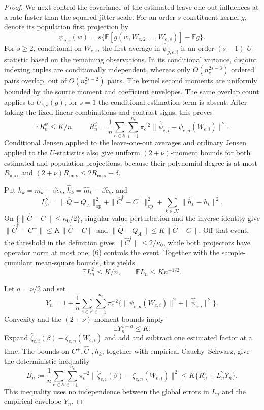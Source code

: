 \documentclass{article}
\begin{document}
\begin{proof}
We next control the covariance of the estimated leave-one-out influences at a rate faster than the squared jitter scale.  For an order-\(s\) constituent kernel \(g\), denote its population first projection by
\[
 \psi_{g,e}(w)=s\{\mathbb E[g(w,W_{e,2},\ldots,W_{e,s})]-\mathbb Eg\}.
\]
For \(s\geq2\), conditional on \(W_{e,i}\), the first average in \(\widehat\psi_{g,e,i}\) is an order-\((s-1)\) \(U\)-statistic based on the remaining observations.  In its conditional variance, disjoint indexing tuples are conditionally independent, whereas only \(O(n_e^{2s-3})\) ordered pairs overlap, out of \(O(n_e^{2s-2})\) pairs.  The kernel second moments are uniformly bounded by the source moment and coefficient envelopes.  The same overlap count applies to \(U_{e,s}(g)\); for \(s=1\) the conditional-estimation term is absent.  After taking the fixed linear combinations and contrast signs, this proves
\[
 \mathbb E R_n^\psi\leq K/n,
 \qquad
 R_n^\psi=\frac1n\sum_{e\in\mathcal E}\sum_{i=1}^{n_e}\pi_e^{-2}
 \|\widehat\psi_{e,i}-\psi_{e,n}(W_{e,i})\|^2. \tag{9}
\]
Conditional Jensen applied to the leave-one-out averages and ordinary Jensen applied to the \(U\)-statistics also give uniform \((2+\nu)\)-moment bounds for both estimated and population projections, because their polynomial degree is at most \(R_{\max}\) and
\((2+\nu)R_{\max}\leq2R_{\max}+\delta\).

Put \(h_k=m_k-\beta c_k\), \(\widehat h_k=\widehat m_k-\beta\widehat c_k\), and
\[
 L_n^2=\|\widehat Q-Q_A\|_{\mathrm{op}}^2
 +\|\widehat C^\dagger-C^+\|_{\mathrm{op}}^2
 +\sum_{k\in\mathcal K}\|\widehat h_k-h_k\|^2. \tag{10}
\]
On \(\{\|\widehat C-C\|\leq\kappa_0/2\}\), singular-value perturbation and the inverse identity give
\(\|\widehat C^\dagger-C^+\|\leq K\|\widehat C-C\|\) and
\(\|\widehat Q-Q_A\|\leq K\|\widehat C-C\|\).  Off that event, the threshold in the definition gives \(\|\widehat C^\dagger\|\leq2/\kappa_0\), while both projectors have operator norm at most one; (6) controls the event.  Together with the sample-cumulant mean-square bounds, this yields
\[
 \mathbb E L_n^2\leq K/n,
 \qquad
 \mathbb E L_n\leq K n^{-1/2}. \tag{11}
\]

Let \(a=\nu/2\) and set
\[
 Y_n=1+\frac1n\sum_{e\in\mathcal E}\sum_{i=1}^{n_e}\pi_e^{-2}
 \{\|\psi_{e,n}(W_{e,i})\|^2+\|\widehat\psi_{e,i}\|^2\}.
\]
Convexity and the \((2+\nu)\)-moment bounds imply
\[
 \mathbb E Y_n^{1+a}\leq K. \tag{12}
\]
Expand \(\widehat\zeta_{e,i}(\beta)-\zeta_{e,n}(W_{e,i})\) and add and subtract one estimated factor at a time.  The bounds on \(C^+,\widehat C^\dagger,h_k\), together with empirical Cauchy--Schwarz, give the deterministic inequality
\[
 B_n:=\frac1n\sum_{e\in\mathcal E}\sum_{i=1}^{n_e}\pi_e^{-2}
 \|\widehat\zeta_{e,i}(\beta)-\zeta_{e,n}(W_{e,i})\|^2
 \leq K\{R_n^\psi+L_n^2Y_n\}. \tag{13}
\]
This inequality uses no independence between the global errors in \(L_n\) and the empirical envelope \(Y_n\).


\end{proof}
\end{document}
